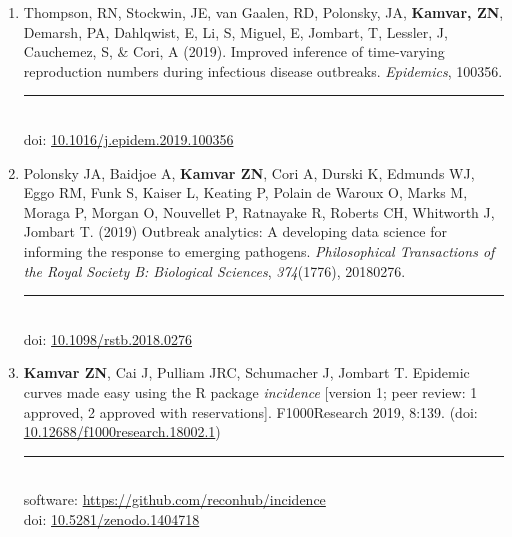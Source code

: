 \begin{enumerate}[leftmargin = 14pt]

  \item Thompson, RN, Stockwin, JE, van Gaalen, RD, Polonsky, JA,
    \textbf{Kamvar, ZN}, Demarsh, PA, Dahlqwist, E, Li, S, Miguel, E, Jombart,
    T, Lessler, J, Cauchemez, S, & Cori, A (2019). Improved inference of
    time-varying reproduction numbers during infectious disease outbreaks.
    \textit{Epidemics}, 100356. \\
	\rule[0.25\baselineskip]{0.25\textwidth}{0.5pt}\\
  doi: \href{https://doi.org/10.1016/j.epidem.2019.100356}{10.1016/j.epidem.2019.100356}

	\vspace{3pt}
  
  \item Polonsky JA, Baidjoe A, \textbf{Kamvar ZN}, Cori A, Durski K, Edmunds
    WJ, Eggo RM, Funk S, Kaiser L, Keating P, Polain de Waroux O, Marks M,
    Moraga P, Morgan O, Nouvellet P, Ratnayake R, Roberts CH, Whitworth J,
    Jombart T.  (2019) Outbreak analytics: A developing data science for
    informing the response to emerging pathogens. \textit{Philosophical
    Transactions of the Royal Society B: Biological Sciences},
    \textit{374}(1776), 20180276.\\ 
	\rule[0.25\baselineskip]{0.25\textwidth}{0.5pt}\\
  doi: \href{https://doi.org/10.1098/rstb.2018.0276}{10.1098/rstb.2018.0276}

	\vspace{3pt}
  
  \item \textbf{Kamvar ZN}, Cai J, Pulliam JRC, Schumacher J, Jombart T.
    Epidemic curves made easy using the R package \textit{incidence} [version
    1; peer review: 1 approved, 2 approved with reservations]. F1000Research 2019, 8:139. (doi:
    \href{https://doi.org/10.12688/f1000research.18002.1}{10.12688/f1000research.18002.1})\\
	\rule[0.25\baselineskip]{0.25\textwidth}{0.5pt}\\
  software: \href{https://github.com/reconhub/incidence#readme}{https://github.com/reconhub/incidence}\\
  doi:\phantom{ware:} \href{https://doi.org/10.5281/zenodo.1404718}{10.5281/zenodo.1404718}

	\vspace{3pt}
  

\end{enumerate}
